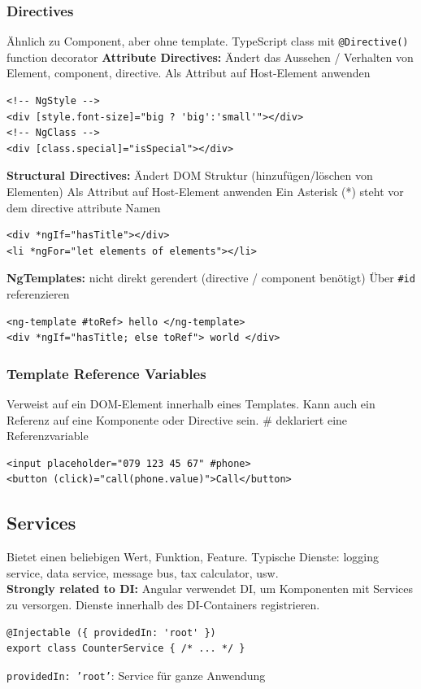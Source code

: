 \subsubsection{Directives}
Ähnlich zu Component, aber ohne template. TypeScript class mit \texttt{\tiny @Directive()} function decorator
\textbf{Attribute Directives:}
Ändert das Aussehen / Verhalten von Element, component, directive. Als Attribut auf Host-Element anwenden
\begin{lstlisting}[style=HTML]
<!-- NgStyle -->
<div [style.font-size]="big ? 'big':'small'"></div>
<!-- NgClass -->
<div [class.special]="isSpecial"></div>
\end{lstlisting}
\textbf{Structural Directives:}
Ändert DOM Struktur (hinzufügen/löschen von Elementen)
Als Attribut auf Host-Element anwenden Ein Asterisk (*) steht vor dem directive attribute Namen
\begin{lstlisting}[style=HTML]
<div *ngIf="hasTitle"></div>
<li *ngFor="let elements of elements"></li>
\end{lstlisting}
\textbf{NgTemplates:}
nicht direkt gerendert (directive / component benötigt)
Über \texttt{\tiny \#id} referenzieren
\begin{lstlisting}[style=HTML]
<ng-template #toRef> hello </ng-template>
<div *ngIf="hasTitle; else toRef"> world </div>
\end{lstlisting}

\subsubsection{Template Reference Variables}
Verweist auf ein DOM-Element innerhalb eines Templates. Kann auch ein Referenz auf eine Komponente oder Directive sein.
\# deklariert eine Referenzvariable
\begin{lstlisting}[style=HTML]
<input placeholder="079 123 45 67" #phone>
<button (click)="call(phone.value)">Call</button>
\end{lstlisting}

\subsection{Services}
Bietet einen beliebigen Wert, Funktion, Feature. Typische Dienste: logging service, data service, message bus, tax calculator, usw.\\
\textbf{Strongly related to DI:} Angular verwendet DI, um Komponenten mit Services zu versorgen. Dienste innerhalb des DI-Containers registrieren.
\begin{lstlisting}[style=JavaScript]
@Injectable ({ providedIn: 'root' })
export class CounterService { /* ... */ }
\end{lstlisting}
\texttt{\tiny providedIn: 'root'}: Service für ganze Anwendung


